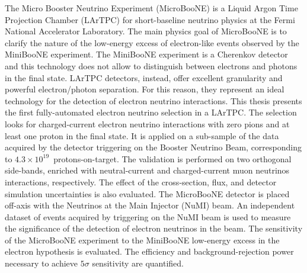 The Micro Booster Neutrino Experiment (MicroBooNE) is a Liquid Argon Time Projection Chamber (LArTPC) for short-baseline neutrino physics at the Fermi National Accelerator Laboratory. The main physics goal of MicroBooNE is to clarify the nature of the low-energy excess of electron-like events observed by the MiniBooNE experiment.
The MiniBooNE experiment is a Cherenkov detector and this technology does not allow to distinguish between electrons and photons in the final state. 
LArTPC detectors, instead, offer excellent granularity and powerful electron/photon separation. For this reason, they represent an ideal technology for the detection of electron neutrino interactions.
This thesis presents the first fully-automated electron neutrino selection in a LArTPC. The selection looks for charged-current electron neutrino interactions with zero pions and at least one proton in the final state. It is applied on a sub-sample of the data acquired by the detector triggering on the Booster Neutrino Beam, corresponding to $4.3\times10^{19}$~protons-on-target. The validation is performed on two orthogonal side-bands, enriched with neutral-current and charged-current muon neutrinos interactions, respectively. The effect of the cross-section, flux, and detector simulation uncertainties is also evaluated. 
The MicroBooNE detector is placed off-axis with the Neutrinos at the Main Injector (NuMI) beam. An independent dataset of events acquired by triggering on the NuMI beam is used to measure the significance of the detection of electron neutrinos in the beam. 
The sensitivity of the MicroBooNE experiment to the MiniBooNE low-energy excess in the electron hypothesis is evaluated. The efficiency and background-rejection power necessary to achieve $5\sigma$ sensitivity are quantified.